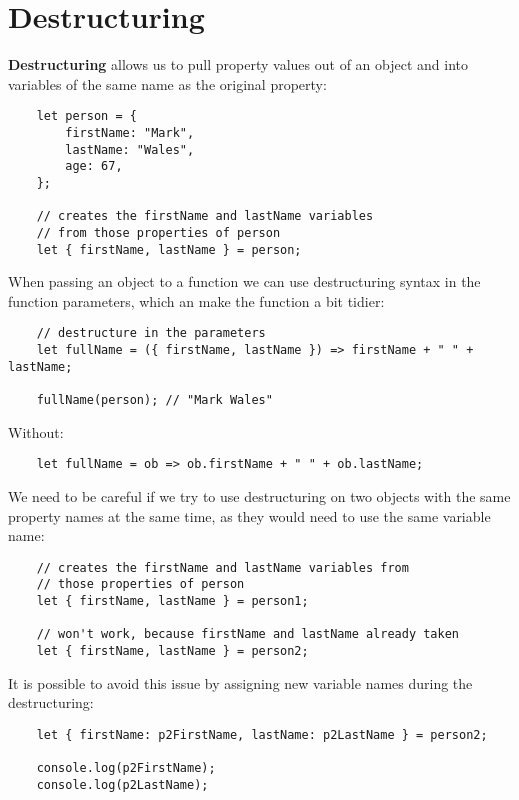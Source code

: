 \section{Destructuring}

\textbf{Destructuring} allows us to pull property values out of an object and into variables of the same name as the original property:

\begin{verbatim}
    let person = {
        firstName: "Mark",
        lastName: "Wales",
        age: 67,
    };

    // creates the firstName and lastName variables
    // from those properties of person
    let { firstName, lastName } = person;
\end{verbatim}

When passing an object to a function we can use destructuring syntax in the function parameters, which an make the function a bit tidier:

\begin{verbatim}
    // destructure in the parameters
    let fullName = ({ firstName, lastName }) => firstName + " " + lastName;

    fullName(person); // "Mark Wales"
\end{verbatim}

\pagebreak

Without:

\begin{verbatim}
    let fullName = ob => ob.firstName + " " + ob.lastName;
\end{verbatim}

We need to be careful if we try to use destructuring on two objects with the same property names at the same time, as they would need to use the same variable name:

\begin{verbatim}
    // creates the firstName and lastName variables from
    // those properties of person
    let { firstName, lastName } = person1;

    // won't work, because firstName and lastName already taken
    let { firstName, lastName } = person2;
\end{verbatim}

It is possible to avoid this issue by assigning new variable names during the destructuring:

\begin{verbatim}
    let { firstName: p2FirstName, lastName: p2LastName } = person2;

    console.log(p2FirstName);
    console.log(p2LastName);
\end{verbatim}


